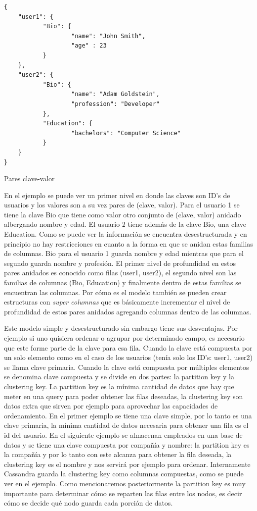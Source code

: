 \documentclass[11pt,a4paper]{article}
\begin{document}
\begin{listing}
\begin{verbatim}
{
	"user1": {
           "Bio": {
                   "name": "John Smith",
                   "age" : 23
           }
    },
    "user2": {
           "Bio": {
                   "name": "Adam Goldstein",
                   "profession": "Developer"
           },
           "Education": {
                   "bachelors": "Computer Science"
           }
    }
}
\end{verbatim}
\caption{Pares clave-valor} 
\label{json-example}
\end{listing}

En el ejemplo se puede ver un primer nivel en donde las claves son ID's de usuarios y los valores son a su vez pares de (clave, valor). Para el usuario 1 se tiene la clave Bio que tiene como valor otro conjunto de (clave, valor) anidado albergando nombre y edad. El usuario 2 tiene además de la clave Bio, una clave Education. Como se puede ver la información se encuentra desestructurada y en principio no hay restricciones en cuanto a la forma en que se anidan estas familias de columnas. Bio para el usuario 1 guarda nombre y edad mientras que para el segundo guarda nombre y profesión. El primer nivel de profundidad en estos pares anidados es conocido como filas (user1, user2), el segundo nivel son las familias de columnas (Bio, Education) y finalmente dentro de estas familias se encuentran las columnas. Por cómo es el modelo también se pueden crear estructuras con \textit{super columnas} que es básicamente incrementar el nivel de profundidad de estos pares anidados agregando columnas dentro de las columnas.

Este modelo simple y desestructurado sin embargo tiene sus desventajas. Por ejemplo si uno quisiera ordenar o agrupar por determinado campo, es necesario que este forme parte de la clave para esa fila. Cuando la clave está compuesta por un solo elemento como en el caso de los usuarios (tenía solo los ID's: user1, user2) se llama clave primaria. Cuando la clave está compuesta por múltiples elementos se denomina clave compuesta y se divide en dos partes: la partition key y la clustering key. La partition key es la mínima cantidad de datos que hay que meter en una query para poder obtener las filas deseadas, la clustering key son datos extra que sirven por ejemplo para aprovechar las capacidades de ordenamiento. En el primer ejemplo se tiene una clave simple, por lo tanto es una clave primaria, la mínima cantidad de datos necesaria para obtener una fila es el id del usuario. En el siguiente ejemplo se almacenan empleados en una base de datos y se tiene una clave compuesta por compañía y nombre: la partition key es la compañía y por lo tanto con este alcanza para obtener la fila deseada, la clustering key es el nombre y nos servirá por ejemplo para ordenar. Internamente Cassandra guarda la clustering key como columnas compuestas, como se puede ver en el ejemplo. Como mencionaremos posteriormente la partition key es muy importante para determinar cómo se reparten las filas entre los nodos, es decir cómo se decide qué nodo guarda cada porción de datos.
\end{document}
